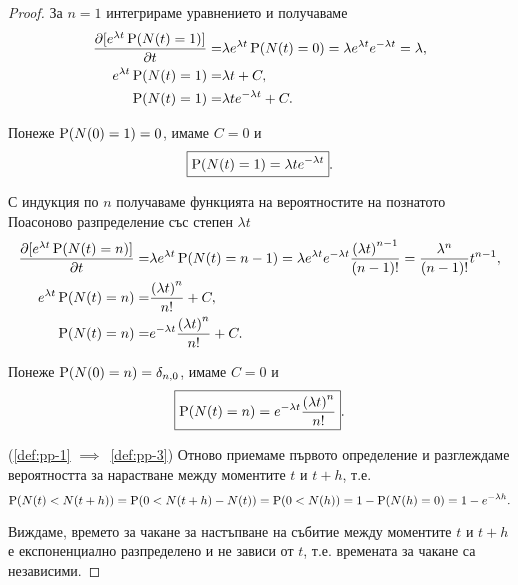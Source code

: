 \documentclass[numbers=endperiod, DIV=15, bibliography=totocnumbered]{scrartcl}
\begin{document}
\begin{proof}
  За $n = 1$ интегрираме уравнението и получаваме
  \begin{align*}
    \frac {\partial [e^{\lambda t} \operatorname{P}(N(t) = 1)]} {\partial t}
    =&
    \lambda e^{\lambda t} \operatorname{P}(N(t) = 0)
    =
    \lambda e^{\lambda t} e^{-\lambda t}
    =
    \lambda,
    \\
    e^{\lambda t} \operatorname{P}(N(t) = 1)
    =&
    \lambda t + C,
    \\
    \operatorname{P}(N(t) = 1)
    =&
    \lambda t e^{-\lambda t} + C.
  \end{align*}

  Понеже $\operatorname{P}(N(0) = 1) = 0$, имаме $C = 0$ и
  \begin{displaymath}
    \boxed{\operatorname{P}(N(t) = 1) = \lambda t e^{-\lambda t}}.
  \end{displaymath}

  С индукция по $n$ получаваме функцията на вероятностите на познатото Поасоново разпределение със степен $\lambda t$
  \begin{align*}
    \frac {\partial [e^{\lambda t} \operatorname{P}(N(t) = n)]} {\partial t}
    =&
    \lambda e^{\lambda t} \operatorname{P}(N(t) = n - 1)
    =
    \lambda e^{\lambda t} e^{-\lambda t} \frac {{(\lambda t)}^{n-1}} {(n-1)!}
    =
    \frac {\lambda^n} {(n-1)!} t^{n-1},
    \\
    e^{\lambda t} \operatorname{P}(N(t) = n)
    =&
    \frac {{(\lambda t)}^n} {n!} + C,
    \\
    \operatorname{P}(N(t) = n)
    =&
    e^{-\lambda t} \frac {{(\lambda t)}^n} {n!} + C.
  \end{align*}

  Понеже $\operatorname{P}(N(0) = n) = \delta_{n,0}$, имаме $C = 0$ и
  \begin{displaymath}
    \boxed{\operatorname{P}(N(t) = n) = e^{-\lambda t} \frac {{(\lambda t)}^n} {n!}}.
  \end{displaymath}

  (\ref{def:pp-1} $\implies$~\ref{def:pp-3}) Отново приемаме първото определение и разглеждаме вероятността за нарастване между моментите $t$ и $t+h$, т.е.
  \begin{displaymath}
    \operatorname{P}(N(t) < N(t+h))
    =
    \operatorname{P}(0 < N(t+h) - N(t))
    =
    \operatorname{P}(0 < N(h))
    =
    1 - \operatorname{P}(N(h) = 0)
    =
    1 - e^{-\lambda h}.
  \end{displaymath}

  Виждаме, времето за чакане за настъпване на събитие между моментите $t$ и $t+h$ е експоненциално разпределено и не зависи от $t$, т.е. времената за чакане са независими.


\end{proof}
\end{document}
